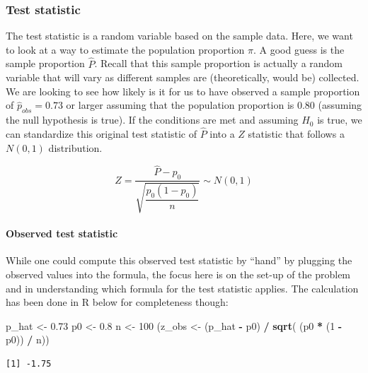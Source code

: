 \documentclass[12pt,]{krantz}
\makeatletter
\newenvironment{Shaded}{\begin{snugshade}}{\end{snugshade}}
\newcommand{\KeywordTok}[1]{\textcolor[rgb]{0.27,0.27,0.27}{\textbf{#1}}}
\newcommand{\DecValTok}[1]{\textcolor[rgb]{0.06,0.06,0.06}{#1}}
\newcommand{\FloatTok}[1]{\textcolor[rgb]{0.06,0.06,0.06}{#1}}
\newcommand{\StringTok}[1]{\textcolor[rgb]{0.5,0.5,0.5}{#1}}
\newcommand{\OperatorTok}[1]{\textcolor[rgb]{0.43,0.43,0.43}{\textbf{#1}}}
\newcommand{\NormalTok}[1]{#1}
\let\oldparagraph\paragraph
\renewcommand{\paragraph}[1]{\oldparagraph{#1}\mbox{}}
\newenvironment{kframe}{%
\medskip{}
\setlength{\fboxsep}{.8em}
 \def\at@end@of@kframe{}%
 \ifinner\ifhmode%
  \def\at@end@of@kframe{\end{minipage}}%
  \begin{minipage}{\columnwidth}%
 \fi\fi%
 \def\FrameCommand##1{\hskip\@totalleftmargin \hskip-\fboxsep
 \colorbox{shadecolor}{##1}\hskip-\fboxsep
     \hskip-\linewidth \hskip-\@totalleftmargin \hskip\columnwidth}%
 \MakeFramed {\advance\hsize-\width
   \@totalleftmargin\z@ \linewidth\hsize
   \@setminipage}}%
 {\par\unskip\endMakeFramed%
 \at@end@of@kframe}
\renewenvironment{Shaded}{\begin{kframe}}{\end{kframe}}
\theoremstyle{definition}
\theoremstyle{definition}
\theoremstyle{definition}
\theoremstyle{remark}
\makeatother
\begin{document}
\subsubsection*{Test statistic}\label{test-statistic-1}


The test statistic is a random variable based on the sample data. Here,
we want to look at a way to estimate the population proportion \(\pi\).
A good guess is the sample proportion \(\hat{P}\). Recall that this
sample proportion is actually a random variable that will vary as
different samples are (theoretically, would be) collected. We are
looking to see how likely is it for us to have observed a sample
proportion of \(\hat{p}_{obs} = 0.73\) or larger assuming that the
population proportion is 0.80 (assuming the null hypothesis is true). If
the conditions are met and assuming \(H_0\) is true, we can standardize
this original test statistic of \(\hat{P}\) into a \(Z\) statistic that
follows a \(N(0, 1)\) distribution.

\[ Z =\dfrac{ \hat{P} - p_0}{\sqrt{\dfrac{p_0(1 - p_0)}{n} }} \sim N(0, 1) \]

\paragraph{Observed test statistic}\label{observed-test-statistic-1}

While one could compute this observed test statistic by ``hand'' by
plugging the observed values into the formula, the focus here is on the
set-up of the problem and in understanding which formula for the test
statistic applies. The calculation has been done in R below for
completeness though:

\begin{Shaded}
\begin{Highlighting}[]
\NormalTok{p_hat <-}\StringTok{ }\FloatTok{0.73}
\NormalTok{p0 <-}\StringTok{ }\FloatTok{0.8}
\NormalTok{n <-}\StringTok{ }\DecValTok{100}
\NormalTok{(z_obs <-}\StringTok{ }\NormalTok{(p_hat }\OperatorTok{-}\StringTok{ }\NormalTok{p0) }\OperatorTok{/}\StringTok{ }\KeywordTok{sqrt}\NormalTok{( (p0 }\OperatorTok{*}\StringTok{ }\NormalTok{(}\DecValTok{1} \OperatorTok{-}\StringTok{ }\NormalTok{p0)) }\OperatorTok{/}\StringTok{ }\NormalTok{n))}
\end{Highlighting}
\end{Shaded}

\begin{verbatim}
[1] -1.75
\end{verbatim}
\end{document}
